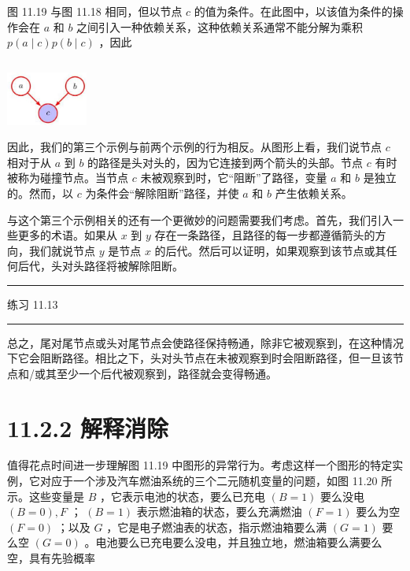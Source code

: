 \documentclass[10pt]{article}
\newcommand{\HRule}{\begin{center}\rule{0.9\linewidth}{0.2mm}\end{center}}
\begin{document}
图 11.19 与图 11.18 相同，但以节点 \(c\) 的值为条件。在此图中，以该值为条件的操作会在 \(a\) 和 \(b\) 之间引入一种依赖关系，这种依赖关系通常不能分解为乘积 \(p\left( {a \mid  c}\right) p\left( {b \mid  c}\right)\) ，因此

\[
\]

\begin{center}
\includegraphics[max width=0.2\textwidth]{images/0194e279-9b28-703a-88f4-c3ac21e2010d_360_1281_344_270_179_0.jpg}
\end{center}
\hspace*{3em} 

因此，我们的第三个示例与前两个示例的行为相反。从图形上看，我们说节点 \(c\) 相对于从 \(a\) 到 \(b\) 的路径是头对头的，因为它连接到两个箭头的头部。节点 \(c\) 有时被称为碰撞节点。当节点 \(c\) 未被观察到时，它“阻断”了路径，变量 \(a\) 和 \(b\) 是独立的。然而，以 \(c\) 为条件会“解除阻断”路径，并使 \(a\) 和 \(b\) 产生依赖关系。

与这个第三个示例相关的还有一个更微妙的问题需要我们考虑。首先，我们引入一些更多的术语。如果从 \(x\) 到 \(y\) 存在一条路径，且路径的每一步都遵循箭头的方向，我们就说节点 \(y\) 是节点 \(x\) 的后代。然后可以证明，如果观察到该节点或其任何后代，头对头路径将被解除阻断。

\HRule

练习 11.13

\HRule

总之，尾对尾节点或头对尾节点会使路径保持畅通，除非它被观察到，在这种情况下它会阻断路径。相比之下，头对头节点在未被观察到时会阻断路径，但一旦该节点和/或其至少一个后代被观察到，路径就会变得畅通。

\section*{11.2.2 解释消除}

值得花点时间进一步理解图 11.19 中图形的异常行为。考虑这样一个图形的特定实例，它对应于一个涉及汽车燃油系统的三个二元随机变量的问题，如图 11.20 所示。这些变量是 \(B\) ，它表示电池的状态，要么已充电 \(\left( {B = 1}\right)\) 要么没电 \(\left( {B = 0}\right) ,F\) ； \(\left( {B = 1}\right)\) 表示燃油箱的状态，要么充满燃油 \(\left( {F = 1}\right)\) 要么为空 \(\left( {F = 0}\right)\) ；以及 \(G\) ，它是电子燃油表的状态，指示燃油箱要么满 \(\left( {G = 1}\right)\) 要么空 \(\left( {G = 0}\right)\) 。电池要么已充电要么没电，并且独立地，燃油箱要么满要么空，具有先验概率
\end{document}
